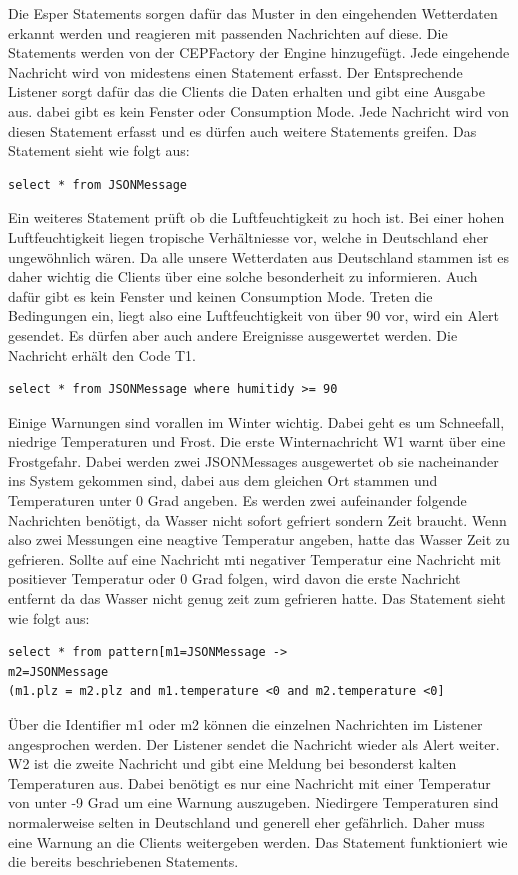 Die Esper Statements sorgen dafür das Muster in den eingehenden Wetterdaten erkannt werden und reagieren mit passenden Nachrichten auf diese. Die Statements werden von der CEPFactory der Engine hinzugefügt. Jede eingehende Nachricht wird von midestens einen Statement erfasst. Der Entsprechende Listener sorgt dafür das die Clients die Daten erhalten und gibt eine Ausgabe aus. dabei gibt es kein Fenster oder Consumption Mode. Jede Nachricht wird von diesen Statement erfasst und es dürfen auch weitere Statements greifen. Das Statement sieht wie folgt aus: 
\begin{lstlisting}
select * from JSONMessage
\end{lstlisting}
Ein weiteres Statement prüft ob die Luftfeuchtigkeit zu hoch ist. Bei einer hohen Luftfeuchtigkeit liegen tropische Verhältniesse vor, welche in Deutschland eher ungewöhnlich wären. Da alle unsere Wetterdaten aus Deutschland stammen ist es daher wichtig die Clients über eine solche besonderheit zu informieren. Auch dafür gibt es kein Fenster und keinen Consumption Mode. Treten die Bedingungen ein, liegt also eine Luftfeuchtigkeit von über 90 vor, wird ein Alert gesendet. Es dürfen aber auch andere Ereignisse ausgewertet werden.  Die Nachricht erhält den Code T1. 
\begin{lstlisting}
select * from JSONMessage where humitidy >= 90
\end{lstlisting}
Einige Warnungen sind vorallen im Winter wichtig. Dabei geht es um Schneefall, niedrige Temperaturen und Frost. Die erste Winternachricht W1 warnt über eine Frostgefahr. Dabei werden zwei JSONMessages ausgewertet ob sie nacheinander ins System gekommen sind, dabei aus dem gleichen Ort stammen und Temperaturen unter 0 Grad angeben. Es werden zwei aufeinander folgende Nachrichten benötigt, da Wasser nicht sofort gefriert sondern Zeit braucht. Wenn also zwei Messungen eine neagtive Temperatur angeben, hatte das Wasser Zeit zu gefrieren. Sollte auf eine Nachricht mti negativer Temperatur eine Nachricht mit positiever Temperatur oder 0 Grad folgen, wird davon die erste Nachricht entfernt da das Wasser nicht genug zeit zum gefrieren hatte. Das Statement sieht wie folgt aus: 
\begin{lstlisting}
select * from pattern[m1=JSONMessage ->
m2=JSONMessage
(m1.plz = m2.plz and m1.temperature <0 and m2.temperature <0]
\end{lstlisting}
Über die Identifier m1 oder m2 können die einzelnen Nachrichten im Listener angesprochen werden. Der Listener sendet die Nachricht wieder als Alert weiter. W2 ist die zweite Nachricht und gibt eine Meldung bei besonderst kalten Temperaturen aus. Dabei benötigt es nur eine Nachricht mit einer Temperatur von unter -9 Grad um eine Warnung auszugeben. Niedirgere Temperaturen sind normalerweise selten in Deutschland und generell eher gefährlich. Daher muss eine Warnung an die Clients weitergeben werden. Das Statement funktioniert wie die bereits beschriebenen Statements. 

